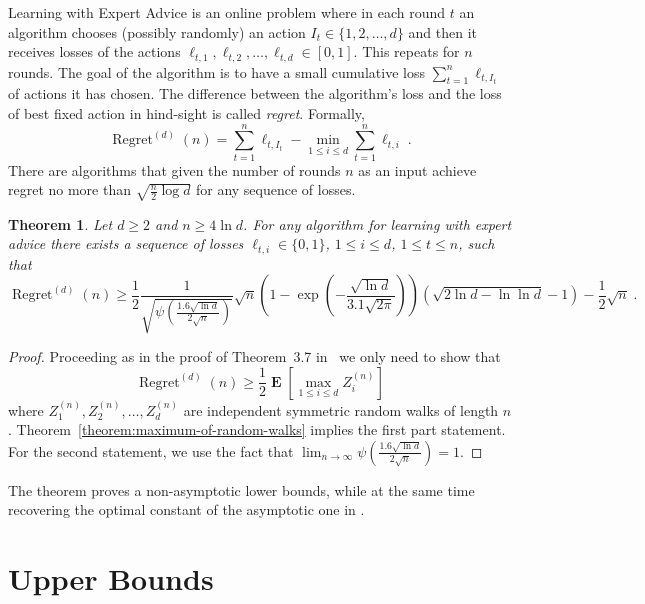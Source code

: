 \documentclass{article}
\DeclareMathOperator*{\Exp}{\mathbf{E}}
\DeclareMathOperator{\Regret}{Regret}
\newtheorem{theorem}{Theorem}
\begin{document}
Learning with Expert Advice is an online problem where in each round $t$ an
algorithm chooses (possibly randomly) an action $I_t \in \{1,2,\dots,d\}$ and
then it receives losses of the actions $\ell_{t,1}, \ell_{t,2}, \dots,
\ell_{t,d} \in [0,1]$. This repeats for $n$ rounds.  The goal of the algorithm
is to have a small cumulative loss $\sum_{t=1}^n \ell_{t,I_t}$ of
actions it has chosen. The difference between the algorithm's loss and the loss of best fixed
action in hind-sight is called \emph{regret}.  Formally,
$$
\Regret^{(d)}(n) = \sum_{t=1}^n \ell_{t,I_t} - \min_{1 \le i \le d} \sum_{t=1}^n \ell_{t,i} \; .
$$
There are algorithms that given the number of rounds $n$ as an input achieve regret no more than $\sqrt{\frac{n}{2} \log d}$
for any sequence of losses.

\begin{theorem}
Let $d \ge 2$ and $n \ge 4 \ln d$. For any algorithm for learning with expert advice there exists a sequence
of losses $\ell_{t,i} \in \{0,1\}$, $1 \le i \le d$, $1 \le t \le n$, such that
$$
\Regret^{(d)}(n) \ge \frac{1}{2}\frac{1}{\sqrt{\psi\left(\frac{1.6 \sqrt{\ln d}}{2 \sqrt{n}}\right)}}\sqrt{n}\left(1 - \exp\left(-\frac{\sqrt{\ln d}}{3.1 \sqrt{2\pi}}\right)\right) \left(\sqrt{2 \ln d - \ln \ln d}-1\right) -\frac{1}{2}\sqrt{n} \; .
$$
\end{theorem}

\begin{proof}
Proceeding as in the proof of Theorem~3.7 in~\citep{Cesa-BianchiL06} we only need to show that
$$
\Regret^{(d)}{(n)} \ge \frac{1}{2} \Exp \left[ \max_{1 \le i \le d} Z^{(n)}_i \right]
$$
where $Z^{(n)}_1, Z^{(n)}_2, \dots, Z^{(n)}_d$ are independent symmetric random walks of length $n$. Theorem~\ref{theorem:maximum-of-random-walks} implies
the first part statement. For the second statement, we use the fact that $\lim_{n \to \infty} \psi\left(\frac{1.6 \sqrt{\ln d}}{2 \sqrt{n}}\right) = 1$.
\end{proof}

The theorem proves a non-asymptotic lower bounds, while at the same time
recovering the optimal constant of the asymptotic one in
\citet{Cesa-BianchiL06}.




\appendix

\section{Upper Bounds}
\label{section:upper-bounds}
\end{document}
